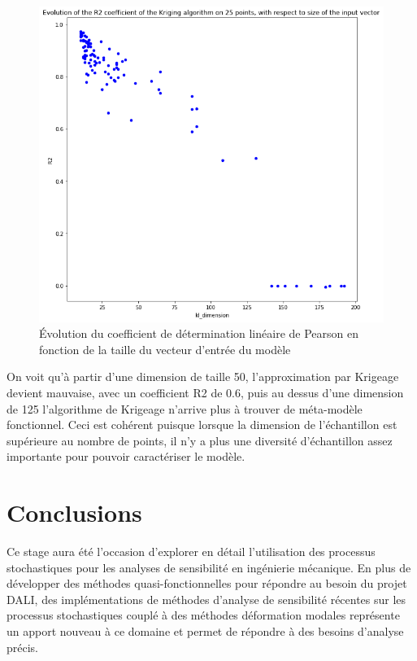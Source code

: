\documentclass[a4paper,10pt]{article}
\begin{document}
\begin{figure}[H]
   \centering
   \noindent \includegraphics[width = \linewidth]{R2_evolution.png}
      \caption{Évolution du coefficient de détermination linéaire de Pearson en fonction de la taille du vecteur d'entrée du modèle}
         \label{R2_evolution}
\end{figure}

On voit qu'à partir d'une dimension de taille 50, l'approximation par Krigeage devient mauvaise, avec un coefficient R2 de 0.6, puis au dessus d'une dimension de 125 l'algorithme de Krigeage n'arrive plus à trouver de méta-modèle fonctionnel. Ceci est cohérent puisque lorsque la dimension de l’échantillon est supérieure au nombre de points, il n'y a plus une diversité d'échantillon assez importante pour pouvoir caractériser le modèle. 

\section{Conclusions}

Ce stage aura été l'occasion d'explorer en détail l'utilisation des processus stochastiques pour les analyses de sensibilité en ingénierie mécanique. En plus de développer des méthodes quasi-fonctionnelles pour répondre au besoin du projet DALI, des implémentations de méthodes d'analyse de sensibilité récentes sur les processus stochastiques couplé à des méthodes déformation modales représente un apport nouveau à ce domaine et permet de répondre à des besoins d'analyse précis. \par \bigskip
\end{document}

